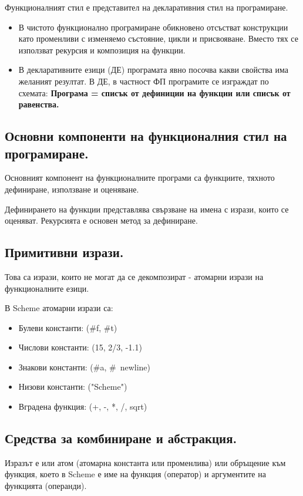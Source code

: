 \documentclass{article}
\renewcommand{\\}{\newline}
\begin{document}
Функционалният стил е представител на декларативния стил на програмиране.
\begin{itemize}
    \item В чистото функционално програмиране обикновено отсъстват конструкции като променливи с изменяемо състояние, цикли и присвояване. Вместо тях се използват рекурсия и композиция на функции. 
    \item В декларативните езици (ДЕ) програмата явно посочва какви свойства има желаният резултат. В ДЕ, в частност ФП програмите се изграждат по схемата: \\\textbf{Програма = списък от дефиниции на функции или списък от равенства.}
\end{itemize}
\subsection{Основни компоненти на функционалния стил на програмиране.}

Основният компонент на функционалните програми са функциите, тяхното дефиниране, използване и оценяване.

Дефинирането на функции представлява свързване на имена с изрази, които се оценяват. Рекурсията е основен метод за дефиниране.

\subsection{Примитивни изрази.}

Това са изрази, които не могат да се декомпозират - атомарни изрази на функционалните езици.

В Scheme атомарни изрази са: \begin{itemize}
  \item Булеви константи: (\#f, \#t)
  \item Числови константи: (15, 2/3, -1.1)
  \item Знакови константи: (\#a, \#\ newline)
  \item Низови константи: ("Scheme")
  \item Вградена функция: (+, -, *, /, sqrt)
\end{itemize}
\subsection{Средства за комбиниране и абстракция.}

Изразът е или атом (атомарна константа или променлива) или обръщение към функция, което в Scheme е име на функция (оператор) и аргументите на функцията (операнди).
\end{document}
